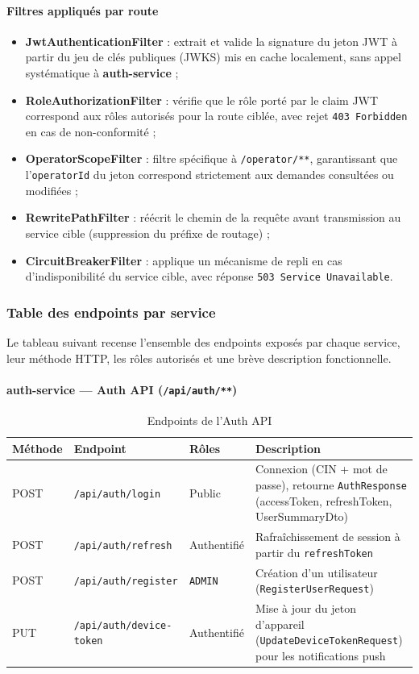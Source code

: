 \documentclass[11pt,a4paper]{article}
\begin{document}
\paragraph{Filtres appliqués par route}
\begin{itemize}
    \item \textbf{JwtAuthenticationFilter} : extrait et valide la signature du jeton JWT
    à partir du jeu de clés publiques (JWKS) mis en cache localement, sans appel systématique
    à \textbf{auth-service} ;
    \item \textbf{RoleAuthorizationFilter} : vérifie que le rôle porté par le claim JWT
    correspond aux rôles autorisés pour la route ciblée, avec rejet \texttt{403 Forbidden}
    en cas de non-conformité ;
    \item \textbf{OperatorScopeFilter} : filtre spécifique à \texttt{/operator/**},
    garantissant que l'\texttt{operatorId} du jeton correspond strictement aux demandes
    consultées ou modifiées ;
    \item \textbf{RewritePathFilter} : réécrit le chemin de la requête avant transmission
    au service cible (suppression du préfixe de routage) ;
    \item \textbf{CircuitBreakerFilter} : applique un mécanisme de repli en cas
    d'indisponibilité du service cible, avec réponse \texttt{503 Service Unavailable}.
\end{itemize}


\subsubsection{Table des endpoints par service}

Le tableau suivant recense l'ensemble des endpoints exposés par chaque service, leur
méthode HTTP, les rôles autorisés et une brève description fonctionnelle.

\paragraph{auth-service — Auth API (\texttt{/api/auth/**})}
\begin{table}[H]
\centering
\small
\begin{tabular}{|p{1.4cm}|p{3.4cm}|p{2.4cm}|p{6cm}|}
\hline
\textbf{Méthode} & \textbf{Endpoint} & \textbf{Rôles} & \textbf{Description} \\
\hline
POST & \texttt{/api/auth/login} & Public & Connexion (CIN + mot de passe), retourne \texttt{AuthResponse} (accessToken, refreshToken, UserSummaryDto) \\
\hline
POST & \texttt{/api/auth/refresh} & Authentifié & Rafraîchissement de session à partir du \texttt{refreshToken} \\
\hline
POST & \texttt{/api/auth/register} & \texttt{ADMIN} & Création d'un utilisateur (\texttt{RegisterUserRequest}) \\
\hline
PUT & \texttt{/api/auth/device-token} & Authentifié & Mise à jour du jeton d'appareil (\texttt{UpdateDeviceTokenRequest}) pour les notifications push \\
\hline
\end{tabular}
\caption{Endpoints de l'Auth API}
\end{table}
\end{document}
